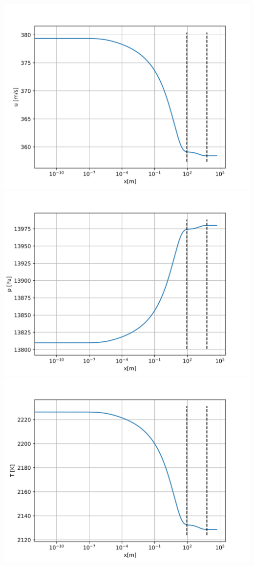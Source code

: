 \documentclass[
]{article}
\begin{document}
\includegraphics{images/40km/NequilibriumFlowNSW_u.svg}\\
\includegraphics{images/40km/NequilibriumFlowNSW_p.svg}\\
\includegraphics{images/40km/NequilibriumFlowNSW_T.svg}\\
\end{document}
